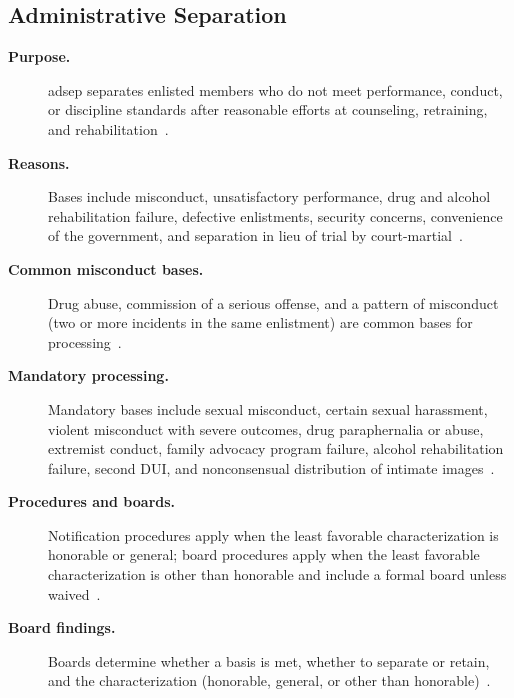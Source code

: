 \documentclass[../main.tex]{subfiles}
\begin{document}
\subsection{Administrative Separation}
\begin{description}
  \item[\textbf{Purpose.}] \ac{adsep} separates enlisted members who do not meet performance, conduct, or discipline standards after reasonable efforts at counseling, retraining, and rehabilitation~\autocite{edo-5-1-1-naval-justice-standards-2025}.
  \item[\textbf{Reasons.}] Bases include misconduct, unsatisfactory performance, drug and alcohol rehabilitation failure, defective enlistments, security concerns, convenience of the government, and separation in lieu of trial by court-martial~\autocite{edo-5-1-1-naval-justice-standards-2025}.
  \item[\textbf{Common misconduct bases.}] Drug abuse, commission of a serious offense, and a pattern of misconduct (two or more incidents in the same enlistment) are common bases for processing~\autocite{edo-5-1-1-naval-justice-standards-2025}.
  \item[\textbf{Mandatory processing.}] Mandatory bases include sexual misconduct, certain sexual harassment, violent misconduct with severe outcomes, drug paraphernalia or abuse, extremist conduct, family advocacy program failure, alcohol rehabilitation failure, second DUI, and nonconsensual distribution of intimate images~\autocite{edo-5-1-1-naval-justice-standards-2025}.
  \item[\textbf{Procedures and boards.}] Notification procedures apply when the least favorable characterization is honorable or general; board procedures apply when the least favorable characterization is other than honorable and include a formal board unless waived~\autocite{edo-5-1-1-naval-justice-standards-2025}.
  \item[\textbf{Board findings.}] Boards determine whether a basis is met, whether to separate or retain, and the characterization (honorable, general, or other than honorable)~\autocite{edo-5-1-1-naval-justice-standards-2025}.
\end{description}
\end{document}
